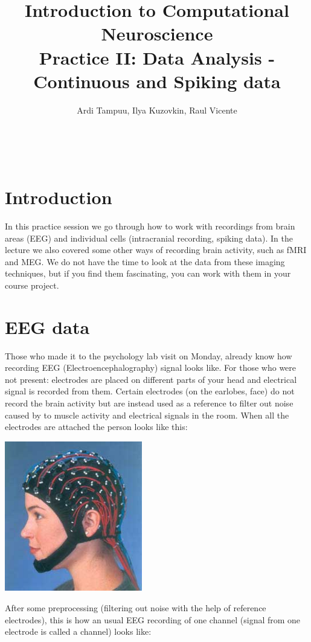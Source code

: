 \documentclass[a4paper,11pt]{article}
\author{\large{Ardi Tampuu, Ilya Kuzovkin, Raul Vicente}}
\title{\huge{Introduction to Computational Neuroscience}\\\LARGE{Practice II: Data Analysis - Continuous and Spiking data}}
\begin{document}
\maketitle
\ \\
\section{Introduction}
In this practice session we go through how to work with recordings from brain areas (EEG) and individual cells (intracranial recording, spiking data). In the lecture we also covered some other ways of recording brain activity, such as fMRI and MEG. We do not have the time to look at the data from these imaging techniques, but if you find them fascinating, you can work with them in your course project.

\section{EEG data}
Those who made it to the psychology lab visit on Monday, already know how recording EEG (Electroencephalography) signal looks like. For those who were not present: electrodes are placed on different parts of your head and electrical signal is recorded from them. Certain electrodes (on the earlobes, face) do not record the brain activity but are instead used as a reference to filter out noise caused by to muscle activity and electrical signals in the room. When all the electrodes are attached the person looks like this:\\
\begin{center}
\includegraphics[width=6cm]{eeg.jpg}
\end{center}
After some preprocessing (filtering out noise with the help of reference electrodes), this is how an usual EEG recording of one channel (signal from one electrode is called a channel) looks like:
\end{document}
